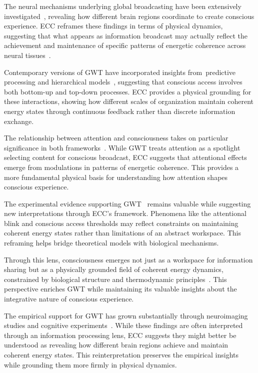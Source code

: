 The neural mechanisms underlying global broadcasting have been extensively investigated~\cite{Dehaene2014, Dehaene2021}, revealing how different brain regions coordinate to create conscious experience. ECC reframes these findings in terms of physical dynamics, suggesting that what appears as information broadcast may actually reflect the achievement and maintenance of specific patterns of energetic coherence across neural tissues~\cite{Mashour2020, McFadden2020}.

Contemporary versions of GWT have incorporated insights from~predictive processing and hierarchical models~\cite{Dehaene2011, Clark2019}, suggesting that conscious access involves both bottom-up and top-down processes. ECC provides a physical grounding for these interactions, showing how different scales of organization maintain coherent energy states through continuous feedback rather than discrete information exchange.

The relationship between attention and consciousness takes on particular significance in both frameworks~\cite{Baars2013, Graziano2019}. While GWT treats attention as a spotlight selecting content for conscious broadcast, ECC suggests that attentional effects emerge from modulations in patterns of energetic coherence. This provides a more fundamental physical basis for understanding how attention shapes conscious experience.

The experimental evidence supporting GWT~\cite{Sergent2004, Koivisto2010} remains valuable while suggesting new interpretations through ECC's framework. Phenomena like the attentional blink and conscious access thresholds may reflect constraints on maintaining coherent energy states rather than limitations of an abstract workspace. This reframing helps bridge theoretical models with biological mechanisms.

Through this lens, consciousness emerges not just as a workspace for information sharing but as a physically grounded field of coherent energy dynamics, constrained by biological structure and thermodynamic principles~\cite{Dehaene2001, Friston2010}. This perspective enriches GWT while maintaining its valuable insights about the integrative nature of conscious experience.

The empirical support for GWT has grown substantially through neuroimaging studies and cognitive experiments~\cite{Dehaene2006, Fahrenfort2007}. While these findings are often interpreted through an information processing lens, ECC suggests they might better be understood as revealing how different brain regions achieve and maintain coherent energy states. This reinterpretation preserves the empirical insights while grounding them more firmly in physical dynamics.

